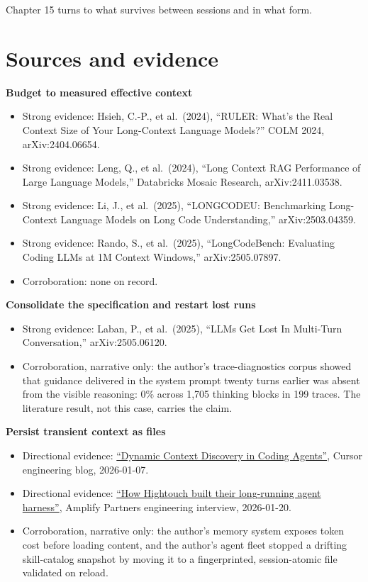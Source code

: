 Chapter 15 turns to what survives between sessions and in what form.

\section*{Sources and evidence}

\textbf{Budget to measured effective context}

\begin{itemize}
\tightlist
\item
  Strong evidence: Hsieh, C.-P., et al.~(2024), ``RULER: What's the Real Context Size of Your Long-Context Language Models?'' COLM 2024, arXiv:2404.06654.
\item
  Strong evidence: Leng, Q., et al.~(2024), ``Long Context RAG Performance of Large Language Models,'' Databricks Mosaic Research, arXiv:2411.03538.
\item
  Strong evidence: Li, J., et al.~(2025), ``LONGCODEU: Benchmarking Long-Context Language Models on Long Code Understanding,'' arXiv:2503.04359.
\item
  Strong evidence: Rando, S., et al.~(2025), ``LongCodeBench: Evaluating Coding LLMs at 1M Context Windows,'' arXiv:2505.07897.
\item
  Corroboration: none on record.
\end{itemize}

\textbf{Consolidate the specification and restart lost runs}

\begin{itemize}
\tightlist
\item
  Strong evidence: Laban, P., et al.~(2025), ``LLMs Get Lost In Multi-Turn Conversation,'' arXiv:2505.06120.
\item
  Corroboration, narrative only: the author's trace-diagnostics corpus showed that guidance delivered in the system prompt twenty turns earlier was absent from the visible reasoning: 0\% across 1,705 thinking blocks in 199 traces. The literature result, not this case, carries the claim.
\end{itemize}

\textbf{Persist transient context as files}

\begin{itemize}
\tightlist
\item
  Directional evidence: \href{https://cursor.com/blog/dynamic-context-discovery}{``Dynamic Context Discovery in Coding Agents''}, Cursor engineering blog, 2026-01-07.
\item
  Directional evidence: \href{https://www.amplifypartners.com/blog-posts/how-hightouch-built-their-long-running-agent-harness}{``How Hightouch built their long-running agent harness''}, Amplify Partners engineering interview, 2026-01-20.
\item
  Corroboration, narrative only: the author's memory system exposes token cost before loading content, and the author's agent fleet stopped a drifting skill-catalog snapshot by moving it to a fingerprinted, session-atomic file validated on reload.
\end{itemize}

